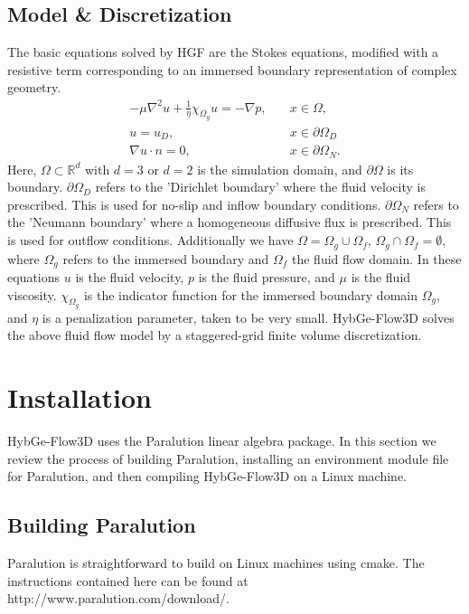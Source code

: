 \documentclass{report}
\begin{document}
\section{Model \& Discretization}

The basic equations solved by HGF are the Stokes equations, modified
with a resistive term corresponding to an immersed boundary representation of complex geometry.
\begin{align*}
  -\mu \nabla^2 u + \frac{1}{\eta}\chi_{\Omega_g}u = -\nabla p, \quad &x\in \Omega, \\
  u = u_D, \quad &x\in \partial \Omega_D \\
  \nabla u \cdot n = 0, \quad &x\in \partial \Omega_N.
\end{align*}
Here, $\Omega \subset \mathbb{R}^d$ with $d=3$ or $d=2$ is the simulation domain,
and $\partial \Omega$ is its boundary. $\partial \Omega_D$ refers to the
'Dirichlet boundary' where the fluid velocity is prescribed. This is used
for no-slip and inflow boundary conditions.
$\partial \Omega_N$ refers to the 'Neumann boundary' where a homogeneous diffusive flux
is prescribed. This is used for outflow conditions.
Additionally we have $\Omega = \Omega_g \cup \Omega_f$, $\Omega_g \cap \Omega_f = \emptyset$,
where $\Omega_g$ refers to the immersed boundary and $\Omega_f$ the fluid flow domain.
In these equations $u$ is the fluid velocity, $p$ is the fluid pressure,
and $\mu$ is the fluid viscosity. $\chi_{\Omega_g}$ is the indicator function
for the immersed boundary domain $\Omega_g$, and $\eta$ is a penalization
parameter, taken to be very small.
HybGe-Flow3D solves the above fluid flow model by a staggered-grid
finite volume discretization.

\chapter{Installation}

HybGe-Flow3D uses the Paralution linear algebra package. In this section
we review the process of building Paralution, installing an environment module file
for Paralution,
and then compiling HybGe-Flow3D on a Linux machine.

\section{Building Paralution}

Paralution is straightforward to build on Linux machines
using cmake. The instructions contained here can be found at \\
http://www.paralution.com/download/.\\
\end{document}
